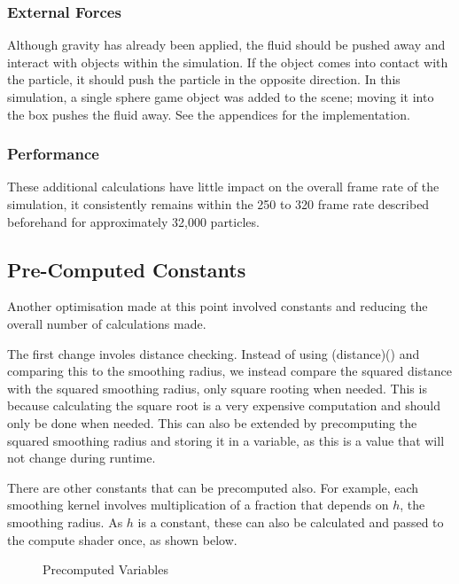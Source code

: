 \documentclass[12pt]{article}
\newcommand{\wideimage}[2][]{%
  \makebox[\textwidth][c]{\texttt{[image: \#2]}}%
}
\begin{document}
    \subsubsection{External Forces}

    Although gravity has already been applied, the fluid should be pushed away and interact with objects within the simulation. If the object comes into contact with the particle, it should push the particle in the opposite direction. In this simulation, a single sphere game object was added to the scene; moving it into the box pushes the fluid away. See the appendices for the implementation.

    \subsubsection{Performance}

    These additional calculations have little impact on the overall frame rate of the simulation, it consistently remains within the 250 to 320 frame rate described beforehand for approximately 32,000 particles.

    \subsection{Pre-Computed Constants}

    Another optimisation made at this point involved constants and reducing the overall number of calculations made.

    The first change involes distance checking. Instead of using \textsc(distance)() and comparing this to the smoothing radius, we instead compare the squared distance with the squared smoothing radius, only square rooting when needed. This is because calculating the square root is a very expensive computation and should only be done when needed. This can also be extended by precomputing the squared smoothing radius and storing it in a variable, as this is a value that will not change during runtime.

    There are other constants that can be precomputed also. For example, each smoothing kernel involves multiplication of a fraction that depends on $h$, the smoothing radius. As $h$ is a constant, these can also be calculated and passed to the compute shader once, as shown below.

    \begin{figure}[H]
        \begin{center}
            \wideimage[width=1.1\textwidth]{precomputeMults.png}
            \caption{Precomputed Variables \cite{lague2}}
        \end{center}
    \end{figure}
\end{document}
